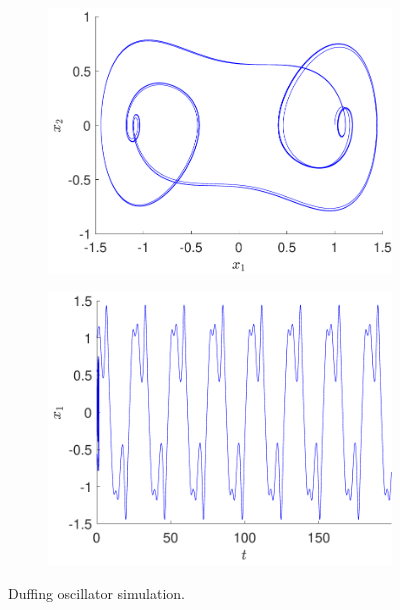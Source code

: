     \begin{figure}[H]
    \centering
    \begin{subfigure}[ht]{0.45\textwidth}
    \includegraphics[scale=0.38]{files/duffing_phase.pdf}
    \end{subfigure}
    \begin{subfigure}[ht]{0.45\textwidth}
    \includegraphics[scale=0.38]{files/duffing_time.pdf}
    \end{subfigure}
    \caption{Duffing oscillator simulation.}
    \label{fig:duffing}
    \end{figure}
    
